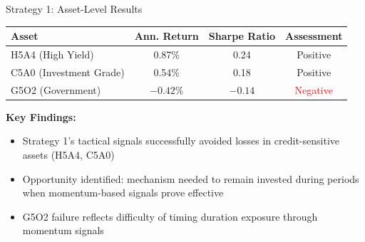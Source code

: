 \documentclass[aspectratio=169,10pt]{beamer}
\begin{document}
\begin{frame}{Strategy 1: Asset-Level Results}
\begin{center}
\begin{tabular}{lccc}
\toprule
\textbf{Asset} & \textbf{Ann. Return} & \textbf{Sharpe Ratio} & \textbf{Assessment} \\
\midrule
H5A4 (High Yield) & 0.87\% & 0.24 & Positive \\
C5A0 (Investment Grade) & 0.54\% & 0.18 & Positive \\
G5O2 (Government) & $-0.42\%$ & $-0.14$ & \textcolor{red}{Negative} \\
\bottomrule
\end{tabular}
\end{center}

\vspace{0.4cm}

\textbf{Key Findings:}
\begin{itemize}
    \item Strategy 1's tactical signals successfully avoided losses in credit-sensitive assets (H5A4, C5A0)

    \item Opportunity identified: mechanism needed to remain invested during periods when momentum-based signals prove effective

    \item G5O2 failure reflects difficulty of timing duration exposure through momentum signals
\end{itemize}
\end{frame}
\end{document}
